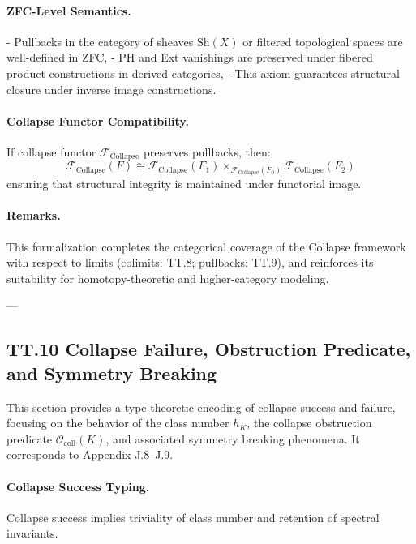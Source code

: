 \documentclass[11pt]{article}
\begin{document}
{\paragraph{ZFC-Level Semantics.}
- Pullbacks in the category of sheaves \( \mathrm{Sh}(X) \) or filtered topological spaces are well-defined in ZFC,
- PH and Ext vanishings are preserved under fibered product constructions in derived categories,
- This axiom guarantees structural closure under inverse image constructions.

\paragraph{Collapse Functor Compatibility.}
If collapse functor \( \mathcal{F}_{\text{Collapse}} \) preserves pullbacks, then:
\[
\mathcal{F}_{\text{Collapse}}(F) \cong \mathcal{F}_{\text{Collapse}}(F_1) \times_{\mathcal{F}_{\text{Collapse}}(F_0)} \mathcal{F}_{\text{Collapse}}(F_2)
\]
ensuring that structural integrity is maintained under functorial image.

\paragraph{Remarks.}
This formalization completes the categorical coverage of the Collapse framework  
with respect to limits (colimits: TT.8; pullbacks: TT.9), and reinforces its suitability for  
homotopy-theoretic and higher-category modeling.

---

\subsection*{TT.10 Collapse Failure, Obstruction Predicate, and Symmetry Breaking}

This section provides a type-theoretic encoding of collapse success and failure,  
focusing on the behavior of the class number \( h_K \), the collapse obstruction predicate \( \mathcal{O}_{\mathrm{coll}}(K) \),  
and associated symmetry breaking phenomena. It corresponds to Appendix J.8–J.9.

\paragraph{Collapse Success Typing.}
Collapse success implies triviality of class number and retention of spectral invariants.

}
\end{document}
